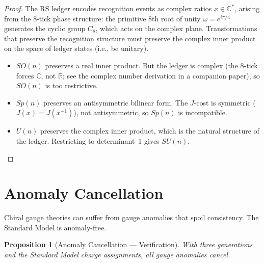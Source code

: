 \documentclass[12pt,a4paper]{article}
\newtheorem{proposition}[theorem]{Proposition}
\theoremstyle{definition}
\theoremstyle{remark}
\begin{document}
\begin{proof}
The RS ledger encodes recognition events as complex ratios
$x \in \mathbb{C}^*$, arising from the 8-tick phase structure:
the primitive 8th root of unity $\omega = e^{i\pi/4}$
generates the cyclic group $C_8$, which acts on the complex
plane.  Transformations that preserve the recognition structure
must preserve the complex inner product on the space of ledger
states (i.e., be unitary).

\begin{itemize}
  \item $SO(n)$ preserves a real inner product.  But the
  ledger is complex (the 8-tick forces $\mathbb{C}$, not
  $\mathbb{R}$; see the complex number derivation in a
  companion paper), so $SO(n)$ is too restrictive.
  \item $Sp(n)$ preserves an antisymmetric bilinear form.
  The $J$-cost is symmetric ($J(x) = J(x^{-1})$), not
  antisymmetric, so $Sp(n)$ is incompatible.
  \item $U(n)$ preserves the complex inner product, which is
  the natural structure of the ledger.  Restricting to
  determinant~1 gives $SU(n)$.
\end{itemize}
\end{proof}

\section{Anomaly Cancellation}
\label{sec:anomaly}

Chiral gauge theories can suffer from gauge anomalies that
spoil consistency.  The Standard Model is anomaly-free.

\begin{proposition}[Anomaly Cancellation --- Verification]
\label{thm:anomaly}
With three generations and the Standard Model charge assignments,
all gauge anomalies cancel.
\end{proposition}
\end{document}

